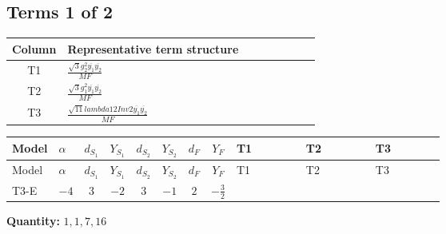 \documentclass[8pt]{article}
\begin{document}
\begin{landscape}
\subsection*{Terms 1 of 2}
\begin{center}
\begin{tabular}{@{}c >{\raggedright\arraybackslash}p{0.82\linewidth}@{}}
\toprule
Column & Representative term structure \\
\midrule
T1 & \(\displaystyle \frac{\sqrt{3} g_{2}^{2} \overline{y_{1}} \overline{y_{2}}}{MF}\) \\
\midrule
T2 & \(\displaystyle \frac{\sqrt{3} g_{1}^{2} \overline{y_{1}} \overline{y_{2}}}{MF}\) \\
\midrule
T3 & \(\displaystyle \frac{\sqrt{11} lambda12Inv2 \overline{y_{1}} \overline{y_{2}}}{MF}\) \\
\midrule
\bottomrule
\end{tabular}
\end{center}
\smallskip
\tiny
\begin{longtable}{@{}llcccccc >{\raggedright\arraybackslash}p{0.21\linewidth} >{\raggedright\arraybackslash}p{0.21\linewidth} >{\raggedright\arraybackslash}p{0.21\linewidth}@{}}
\toprule
Model & $\alpha$ & $d_{S_1}$ & $Y_{S_1}$ & $d_{S_2}$ & $Y_{S_2}$ & $d_F$ & $Y_F$ & T1 & T2 & T3 \\
\midrule
\endfirsthead
\toprule
Model & $\alpha$ & $d_{S_1}$ & $Y_{S_1}$ & $d_{S_2}$ & $Y_{S_2}$ & $d_F$ & $Y_F$ & T1 & T2 & T3 \\
\midrule
\endhead
T3-E & $-4$ & $3$ & $-2$ & $3$ & $-1$ & $2$ & $-\frac{3}{2}$ & \scriptsize\adjustbox{max width=\linewidth}{$\begin{gathered} - \frac{11 \sqrt{3} g_{2}^{2} \overline{y_{1}} \overline{y_{2}}}{8 MF}\end{gathered}$} & \scriptsize\adjustbox{max width=\linewidth}{$\begin{gathered} - \frac{9 \sqrt{3} g_{1}^{2} \overline{y_{1}} \overline{y_{2}}}{8 MF}\end{gathered}$} & \scriptsize\adjustbox{max width=\linewidth}{$\begin{gathered} - \frac{3 \sqrt{11} lambda12Inv2 \overline{y_{1}} \overline{y_{2}}}{22 MF}\end{gathered}$} \\
\midrule
\bottomrule
\end{longtable}
\clearpage
\noindent\textbf{Quantity: }$\mathrm{1,1,7,16}$\par\smallskip

\end{landscape}
\end{document}
